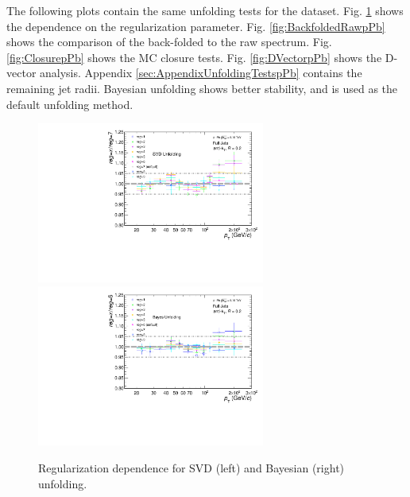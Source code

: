 The following plots contain the same unfolding tests for the \pPb dataset. Fig. \ref{fig:RegIterpPb} shows the dependence on the regularization parameter. Fig. \ref{fig:BackfoldedRawpPb} shows the comparison of the back-folded to the raw spectrum. Fig. \ref{fig:ClosurepPb} shows the MC closure tests. Fig. \ref{fig:DVectorpPb} shows the D-vector analysis. Appendix \ref{sec:AppendixUnfoldingTestspPb} contains the remaining jet radii. Bayesian unfolding shows better stability, and is used as the default unfolding method.

\begin{figure}
    \centering
    \begin{multicols}{2}
            \includegraphics[width=7.5cm]{figures/pPbFigures/UnfoldingComparisons/Regularizations/RatioRegularizationSvd_R02.pdf}
        \vfill\null 
        \columnbreak
            \includegraphics[width=7.5cm]{figures/pPbFigures/UnfoldingComparisons/Regularizations/RatioRegularizationBayes_R02.pdf}
        \vfill\null
    \end{multicols}
    \caption{Regularization dependence for SVD (left) and Bayesian (right) unfolding.}
    \label{fig:RegIterpPb}
\end{figure}

